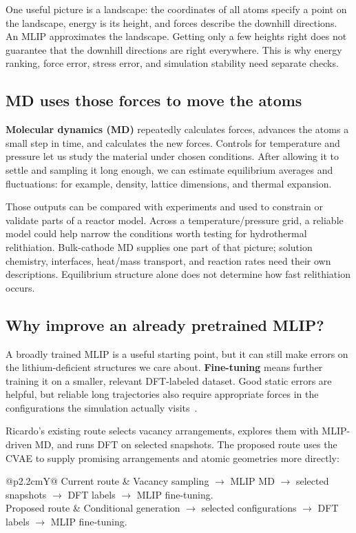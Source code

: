 One useful picture is a landscape: the coordinates of all atoms specify a point on the landscape, energy is its height, and forces describe the downhill directions. An MLIP approximates the landscape. Getting only a few heights right does not guarantee that the downhill directions are right everywhere. This is why energy ranking, force error, stress error, and simulation stability need separate checks.

\subsection*{MD uses those forces to move the atoms}
\textbf{Molecular dynamics (MD)} repeatedly calculates forces, advances the atoms a small step in time, and calculates the new forces. Controls for temperature and pressure let us study the material under chosen conditions. After allowing it to settle and sampling it long enough, we can estimate equilibrium averages and fluctuations: for example, density, lattice dimensions, and thermal expansion.

Those outputs can be compared with experiments and used to constrain or validate parts of a reactor model. Across a temperature/pressure grid, a reliable model could help narrow the conditions worth testing for hydrothermal relithiation. Bulk-cathode MD supplies one part of that picture; solution chemistry, interfaces, heat/mass transport, and reaction rates need their own descriptions. Equilibrium structure alone does not determine how fast relithiation occurs.

\subsection*{Why improve an already pretrained MLIP?}
A broadly trained MLIP is a useful starting point, but it can still make errors on the lithium-deficient structures we care about. \textbf{Fine-tuning} means further training it on a smaller, relevant DFT-labeled dataset. Good static errors are helpful, but reliable long trajectories also require appropriate forces in the configurations the simulation actually visits~\cite{fu}.

Ricardo's existing route selects vacancy arrangements, explores them with MLIP-driven MD, and runs DFT on selected snapshots. The proposed route uses the CVAE to supply promising arrangements and atomic geometries more directly:

\begin{center}\small
\begin{tabularx}{\linewidth}{@{}p{2.2cm}Y@{}}
\toprule
Current route & Vacancy sampling $\rightarrow$ MLIP MD $\rightarrow$ selected snapshots $\rightarrow$ DFT labels $\rightarrow$ MLIP fine-tuning.\\
Proposed route & Conditional generation $\rightarrow$ selected configurations $\rightarrow$ DFT labels $\rightarrow$ MLIP fine-tuning.\\
\bottomrule
\end{tabularx}
\end{center}

